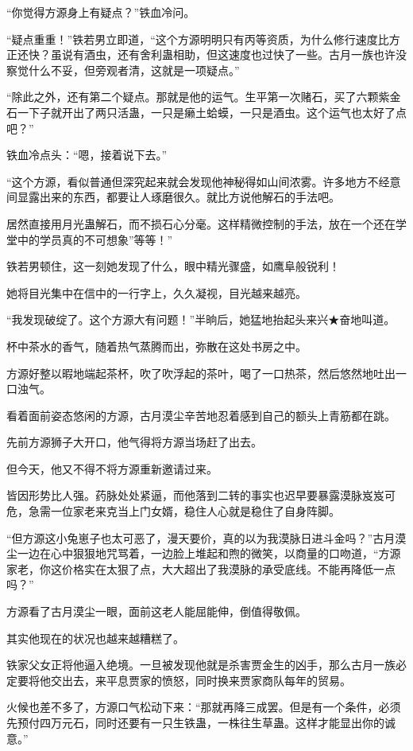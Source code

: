 \begin{this_body}
“你觉得方源身上有疑点？”铁血冷问。

“疑点重重！”铁若男立即道，“这个方源明明只有丙等资质，为什么修行速度比方正还快？虽说有酒虫，还有舍利蛊相助，但这速度也过快了一些。古月一族也许没察觉什么不妥，但旁观者清，这就是一项疑点。”

“除此之外，还有第二个疑点。那就是他的运气。生平第一次赌石，买了六颗紫金石一下子就开出了两只活蛊，一只是癞土蛤蟆，一只是酒虫。这个运气也太好了点吧？”

铁血冷点头：“嗯，接着说下去。”

“这个方源，看似普通但深究起来就会发现他神秘得如山间浓雾。许多地方不经意间显露出来的东西，都要让人琢磨很久。就比方说他解石的手法吧。

居然直接用月光蛊解石，而不损石心分毫。这样精微控制的手法，放在一个还在学堂中的学员真的不可想象”等等！”

铁若男顿住，这一刻她发现了什么，眼中精光骤盛，如鹰阜般锐利！

她将目光集中在信中的一行字上，久久凝视，目光越来越亮。

“我发现破绽了。这个方源大有问题！”半晌后，她猛地抬起头来兴★奋地叫道。

杯中茶水的香气，随着热气蒸腾而出，弥散在这处书房之中。

方源好整以暇地端起茶杯，吹了吹浮起的茶叶，喝了一口热茶，然后悠然地吐出一口浊气。

看着面前姿态悠闲的方源，古月漠尘辛苦地忍着感到自己的额头上青筋都在跳。

先前方源狮子大开口，他气得将方源当场赶了出去。

但今天，他又不得不将方源重新邀请过来。

皆因形势比人强。药脉处处紧逼，而他落到二转的事实也迟早要暴露漠脉岌岌可危，急需一位家老来克当上门女婿，稳住人心就是稳住了自身阵脚。

“但方源这小兔崽子也太可恶了，漫天要价，真的以为我漠脉日进斗金吗？”古月漠尘一边在心中狠狠地咒骂着，一边脸上堆起和煦的微笑，以商量的口吻道，“方源家老，你这价格实在太狠了点，大大超出了我漠脉的承受底线。不能再降低一点吗？”

方源看了古月漠尘一眼，面前这老人能屈能伸，倒值得敬佩。

其实他现在的状况也越来越糟糕了。

铁家父女正将他逼入绝境。一旦被发现他就是杀害贾金生的凶手，那么古月一族必定要将他交出去，来平息贾家的愤怒，同时换来贾家商队每年的贸易。

火候也差不多了，方源口气松动下来：“那就再降三成罢。但是有一个条件，必须先预付四万元石，同时还要有一只生铁蛊，一株往生草蛊。这样才能显出你的诚意。”


\end{this_body}
